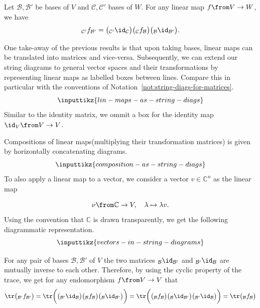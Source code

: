 \documentclass[a4paper,oneside, 12pt]{amsart}
\begin{document}
\begin{corollary}\label{cor:change-of-basis}
  Let \( \mathcal{B}, \mathcal{B}' \) be bases of \(V\) and \( \mathcal{C}, \mathcal{C}' \) bases of \(W\).
  For any linear map \(f \from V\to W\), we have
  \begin{equation*}
    {}_{\mathcal{C}' }f_{\mathcal{B}' }= \big({}_{\mathcal{C}' }\id_{\mathcal{C}}\big)\big({}_{\mathcal{C} }f_{\mathcal{B} }\big)\big({}_{\mathcal{B} }\id_{\mathcal{B}' }\big).
  \end{equation*}
\end{corollary}

\begin{notation}\label{not:string-diags-for-linear-maps}
  One take-away of the previous results is that upon taking bases, linear maps can be translated into matrices and vice-versa.
  Subsequently, we can extend our string diagrams to general vector spaces and their transformations by representing linear maps  as labelled boxes between lines.
  Compare this in particular with the conventions of Notation~\ref{not:string-diags-for-matrices}.
  \begin{equation}
    \inputtikz{lin-maps-as-string-diags}
  \end{equation}
  Similar to the identity matrix, we ommit a box for the identity map \(\id_{V} \from V \to V\).

  Compositions of linear maps(\ie multiplying their transformation matrices) is given by horizontally concatenating diagrams.
  \begin{equation}
    \inputtikz{composition-as-string-diags}
  \end{equation}
  To also apply a linear map to a vector, we consider a vector \(v \in \mathbb{C}^{n}\) as the linear map

  \begin{equation*}
    \nu \from \mathbb{C} \to V,\quad \lambda \mapsto \lambda v.
  \end{equation*}
  Using the convention that \(\mathbb{C}\) is drawn transparently, we get the following diagrammatic representation.
  \begin{equation}
    \inputtikz{vectors-in-string-diagrams}
  \end{equation}
\end{notation}

For any pair of bases \(\mathcal{B}, \mathcal{B}'\)  of \(V\) the two matrices \({}_{\mathcal{B} }\id_{\mathcal{B}'}\) and \({}_{\mathcal{B}'}\id_{\mathcal{B}}\) are mutually inverse to each other.
Therefore, by using the cyclic property of the trace, we get for any endomorphism \(f \from V \to V\) that
\begin{equation*}
  \tr\big({}_{\mathcal{B}' }f_{\mathcal{B}'}\big)
  = \tr\bigg(\big({}_{\mathcal{B}' }\id_{\mathcal{B}}\big)\big({}_{\mathcal{B} }f_{\mathcal{B} }\big)\big({}_{\mathcal{B} }\id_{\mathcal{B}' }\big)\bigg)
  = \tr\bigg(\big({}_{\mathcal{B} }f_{\mathcal{B} }\big)\big({}_{\mathcal{B} }\id_{\mathcal{B}' }\big)\big({}_{\mathcal{B}' }\id_{\mathcal{B}}\big)\bigg)
  = \tr\big({}_{\mathcal{B}}f_{\mathcal{B}}\big)
\end{equation*}
\end{document}
